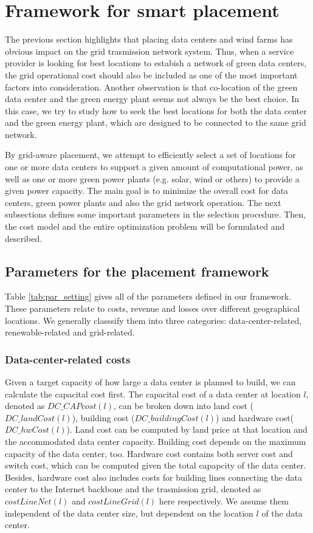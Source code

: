 \section{Framework for smart placement}
\label{sec:framework}

The previous section highlights that placing data centers and wind
farms has obvious impact on the grid trasmission network system. Thus,
when a service provider is looking for best locations to estabish a
network of green data centers, the grid operational cost should also
be included as one of the most important factors into
consideration. Another observation is that co-location of the green
data center and the green energy plant seems not always be the best
choice. In this case, we try to study how to seek the best locations
for both the data center and the green energy plant, which are
designed to be connected to the same grid network.

By grid-aware placement, we attempt to efficiently select a set of locations for one or more data centers to support a given amount of computational power, as well as one or more green power plants (e.g. solar, wind or others) to provide a given power capacity. The main goal is to minimize the overall cost for data centers, green power plants and also the grid network operation. The next subsections defines some important parameters in the selection procedure. Then, the cost model and the entire optimization problem will be formulated and described.

\subsection{Parameters for the placement framework}

Table \ref{tab:par_setting} gives all of the parameters defined in our framework.  These parameters relate to costs, revenue and losses over different geographical locations. We generally classsify them into three categories: data-center-related, renewable-related and grid-related. 

\subsubsection{Data-center-related costs} Given a target capacity of how large a data center is planned to build, we can calculate the capacital cost first. The capacital cost of a data center at location $l$, denoted as $DC\_CAPcost(l)$, can be broken down into land cost ($DC\_landCost(l)$), building cost ($DC\_buildingCost(l)$) and hardware cost($DC\_hwCost(l)$). Land cost can be computed by land price at that location and the accommodated data center capacity. Building cost depends on the maximum capacity of the data center, too. Hardware cost contains both server cost and switch cost, which can be computed given the total capapcity of the data center. Besides, hardware cost also includes costs for building lines connecting the data center to the Internet backbone and the trasmission grid, denoted as $costLineNet(l)$ and $costLineGrid(l)$ here respectively. We assume them independent of the data center size, but dependent on the location $l$ of the data center. 

